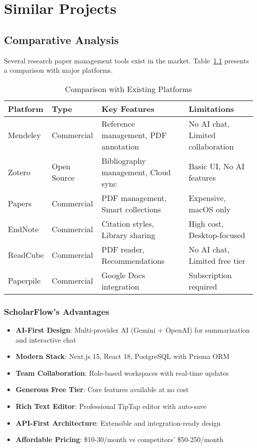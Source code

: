 \chapter{Similar Projects}
\label{ch:similar-projects}

\section{Comparative Analysis}
\label{sec:comparative-analysis}

Several research paper management tools exist in the market. Table~\ref{tab:competitors} presents a comparison with major platforms.

\begin{table}[H]
\centering
\caption{Comparison with Existing Platforms}
\label{tab:competitors}
\small
\begin{tabular}{@{}llll@{}}
\toprule
\textbf{Platform} & \textbf{Type} & \textbf{Key Features} & \textbf{Limitations} \\
\midrule
Mendeley & Commercial & Reference management, PDF annotation & No AI chat, Limited collaboration \\
Zotero & Open Source & Bibliography management, Cloud sync & Basic UI, No AI features \\
Papers & Commercial & PDF management, Smart collections & Expensive, macOS only \\
EndNote & Commercial & Citation styles, Library sharing & High cost, Desktop-focused \\
ReadCube & Commercial & PDF reader, Recommendations & No AI chat, Limited free tier \\
Paperpile & Commercial & Google Docs integration & Subscription required \\
\bottomrule
\end{tabular}
\end{table}

\subsection{ScholarFlow's Advantages}

\begin{itemize}[leftmargin=*,topsep=5pt,itemsep=3pt]
    \item \textbf{AI-First Design}: Multi-provider AI (Gemini + OpenAI) for summarization and interactive chat
    \item \textbf{Modern Stack}: Next.js 15, React 18, PostgreSQL with Prisma ORM
    \item \textbf{Team Collaboration}: Role-based workspaces with real-time updates
    \item \textbf{Generous Free Tier}: Core features available at no cost
    \item \textbf{Rich Text Editor}: Professional TipTap editor with auto-save
    \item \textbf{API-First Architecture}: Extensible and integration-ready design
    \item \textbf{Affordable Pricing}: \$10-30/month vs competitors' \$50-250/month
\end{itemize}
